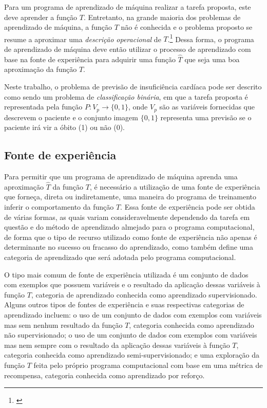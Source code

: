 Para um programa de aprendizado de máquina realizar a tarefa proposta, este deve aprender a função $T$. Entretanto, na grande maioria dos problemas de aprendizado de máquina, a função $T$ não é conhecida e o problema proposto se resume a aproximar uma \textit{descrição operacional} de $T$.\footnote{\cite[p.8]{machine_learning}} Dessa forma, o programa de aprendizado de máquina deve então utilizar o processo de aprendizado com base na fonte de experiência para adquirir uma função $\hat{T}$ que seja uma boa aproximação da função $T$.

Neste trabalho, o problema de previsão de insuficiência cardíaca pode ser descrito como sendo um problema de \textit{classificação binária}, em que a tarefa proposta é representada pela função $P : V_{p} \rightarrow \{0, 1\}$, onde $V_{p}$ são as variáveis fornecidas que descrevem o paciente e o conjunto imagem $\{0, 1\}$ representa uma previsão se o paciente irá vir a óbito (1) ou não (0).

\subsection{Fonte de experiência}

Para permitir que um programa de aprendizado de máquina aprenda uma aproximação $\hat{T}$ da função $T$, é necessário a utilização de uma fonte de experiência que forneça, direta ou indiretamente, uma maneira do programa de treinamento inferir o comportamento da função $T$. Essa fonte de experiência pode ser obtida de várias formas, as quais variam consideravelmente dependendo da tarefa em questão e do método de aprendizado almejado para o programa computacional, de forma que o tipo de recurso utilizado como fonte de experiência não apenas é determinante no sucesso ou fracasso do aprendizado, como também define uma categoria de aprendizado que será adotada pelo programa computacional.

O tipo mais comum de fonte de experiência utilizada é um conjunto de dados com exemplos que possuem variáveis e o resultado da aplicação dessas variáveis à função $T$, categoria de aprendizado conhecida como aprendizado supervisionado. Alguns outros tipos de fontes de experiência e suas respectivas categorias de aprendizado incluem: o uso de um conjunto de dados com exemplos com variáveis mas sem nenhum resultado da função $T$, categoria conhecida como aprendizado não supervisionado; o uso de um conjunto de dados com exemplos com variáveis mas nem sempre com o resultado da aplicação dessas variáveis à função $T$, categoria conhecida como aprendizado semi-supervisionado; e uma exploração da função $T$ feita pelo próprio programa computacional com base em uma métrica de recompensa, categoria conhecida como aprendizado por reforço.

